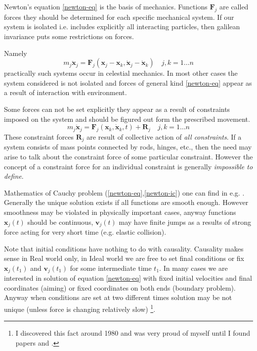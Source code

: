 Newton's equation \eqref{newton-eq} is  the basis of mechanics. Functions 
$\bm F_j$ are called forces they should be determined  for each specific 
mechanical system. If our system is isolated i.e. includes explicitly all 
interacting particles, then galilean invariance puts some restrictions 
on forces.

Namely 
\begin{equation*}
     m_j \ddot {\bm x}_j=
    {\bm F}_j({\bm x}_j-{\bm x}_k,\dot {\bm x}_j-\dot {\bm x}_k)\quad j,k=1\ldots n 
\end{equation*}
practically such systems occur in celestial mechanics. In most other cases the
system considered is not isolated and forces of general kind \eqref{newton-eq} 
appear as a result of interaction with environment.

Some forces can not be set explicitly they appear as a result of constraints
imposed on the system and should be figured out form the prescribed movement.
\begin{equation}
  \label {newton-eq-const}
    m_j \ddot {\bm x}_j={\bm F}_j({\bm x}_k,\dot {\bm x}_k,t) 
    +{\bm R}_j \quad j,k=1\ldots n 
\end{equation}
These constraint forces ${\bm R}_j$ are result of collective action of 
\emph{all constraints}. If a system consists of mass points connected by 
rods, hinges, etc., then the need may arise to talk about the constraint force 
of some particular constraint. However the concept of a constraint force for an 
individual constraint is generally \emph{impossible to define}.

Mathematics of  Cauchy problem (\ref{newton-eq},\ref{newton-ic}) 
one can find in e.g. \cite{Arnold1992}. Generally the unique solution exists if
all functions are smooth enough. However smoothness may be violated in 
physically important cases, anyway functions $\bm x_j(t)$ should be continuous,
$\bm v_j(t)$  may have finite jumps as a results of strong force acting for 
very short time (e.g. elastic collision).

Note that initial conditions have nothing to do with causality. Causality makes
sense in Real world only, in Ideal world we are free to set final conditions or
fix $\bm x_j(t_1)$ and $\bm v_j(t_1)$ for some intermediate time $t_1$. In
many cases we are interested in solution of equation \eqref{newton-eq} with
fixed initial velocities and final coordinates  (aiming) or fixed coordinates
on both ends (boundary problem). Anyway when conditions are set at two
different times  solution may be not unique (unless force is changing
relatively slow) \footnote {I discovered this fact around 1980 and was very
proud of myself until I found papers \cite{Maslov1962a} and \cite{Maslov1962b}.}.

